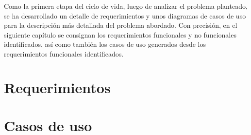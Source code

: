 Como la primera etapa del ciclo de vida, luego de analizar el problema planteado, se ha desarrollado un detalle de requerimientos y unos diagramas de casos de uso para la descripción más detallada del problema abordado. Con precisión, en el siguiente capítulo se consignan los requerimientos funcionales y no funcionales identificados, así como también los casos de uso generados desde los requerimientos funcionales identificados.

\section{Requerimientos}


\section{Casos de uso}
